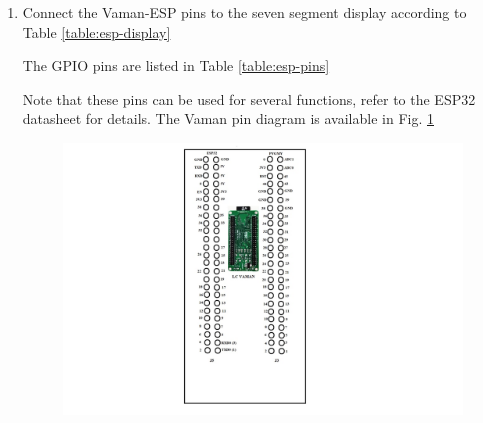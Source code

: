 \documentclass[journal,12pt,twocolumn]{IEEEtran}
\renewcommand\thesection{\arabic{section}}
\begin{document}
\begin{enumerate}[label=\thesection.\arabic*.,ref=\thesection.\theenumi]
\item Connect the Vaman-ESP pins to the seven segment display  according to Table 
		\ref{table:esp-display}
	\begin{table}[!h]
		
		\caption{}
		\label{table:esp-display}
	\end{table}
	The GPIO pins are listed in Table 
		\ref{table:esp-pins}
	\begin{table}[!h]
		
		\caption{}
		\label{table:esp-pins}
	\end{table}
	Note that these pins can be used for several functions, refer to the ESP32 datasheet
		for details.  The Vaman pin diagram is available in 
		Fig. \ref{fig:lc}
	\begin{figure}[!h]
		\includegraphics[width=\columnwidth]{figs/lc.jpg}
		\caption{}
		\label{fig:lc}
	\end{figure}

\end{enumerate}
%
\end{document}
